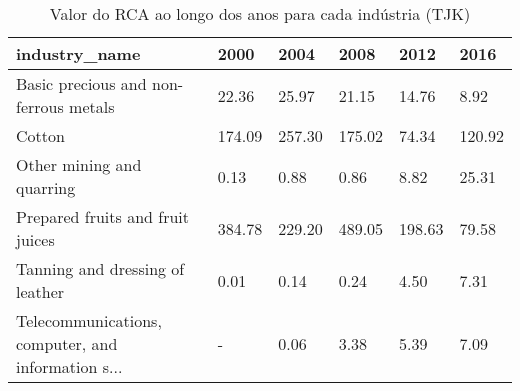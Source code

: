 \begin{table}
\centering
\caption{Valor do RCA ao longo dos anos para cada indústria (TJK)}
\begin{tabular}{p{6cm}p{1.5cm}p{1.5cm}p{1.5cm}p{1.5cm}p{1.5cm}}
\toprule
                                     industry\_name &   2000 &   2004 &   2008 &   2012 &   2016 \\
\midrule
             Basic precious and non-ferrous metals &  22.36 &  25.97 &  21.15 &  14.76 &   8.92 \\
                                            Cotton & 174.09 & 257.30 & 175.02 &  74.34 & 120.92 \\
                         Other mining and quarring &   0.13 &   0.88 &   0.86 &   8.82 &  25.31 \\
                  Prepared fruits and fruit juices & 384.78 & 229.20 & 489.05 & 198.63 &  79.58 \\
                   Tanning and dressing of leather &   0.01 &   0.14 &   0.24 &   4.50 &   7.31 \\
Telecommunications, computer, and information s... &      - &   0.06 &   3.38 &   5.39 &   7.09 \\
\bottomrule
\end{tabular}
\end{table}
